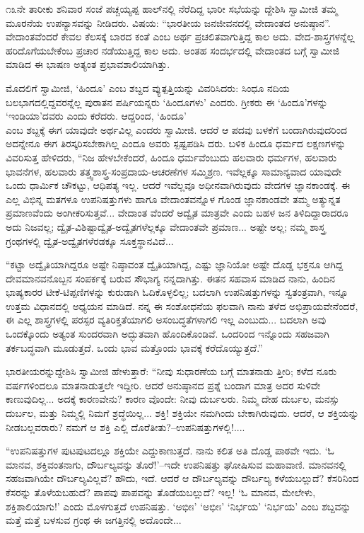 ೧೩ನೇ ತಾರೀಕು ಶನಿವಾರ ಸಂಜೆ ಪಚ್ಚಯ್ಯಪ್ಪ ಹಾಲ್​ನಲ್ಲಿ ನೆರೆದಿದ್ದ ಭಾರೀ ಸಭೆಯನ್ನು ದ್ದೇಶಿಸಿ ಸ್ವಾಮೀಜಿ ತಮ್ಮ ಮೂರನೆಯ ಉಪನ್ಯಾಸವನ್ನು ನೀಡಿದರು. ವಿಷಯ: “ಭಾರತೀಯ ಜನಜೀವನದಲ್ಲಿ ವೇದಾಂತದ ಅನುಷ್ಠಾನ”. ವೇದಾಂತವೆಂದರೆ ಕೇವಲ ಕೆಲಸಕ್ಕೆ ಬಾರದ ಕಂತೆ ಎಂಬ ಅರ್ಥ ಪ್ರಚಲಿತವಾಗುತ್ತಿದ್ದ ಕಾಲ ಅದು. ವೇದ-ಶಾಸ್ತ್ರಗಳನ್ನೆಲ್ಲ ಹರಿದೊಗೆಯಬೇಕೆಂಬ ಪ್ರಚಾರ ನಡೆಯುತ್ತಿದ್ದ ಕಾಲ ಅದು. ಅಂತಹ ಸಂದರ್ಭದಲ್ಲಿ ವೇದಾಂತದ ಬಗ್ಗೆ ಸ್ವಾಮೀಜಿ ಮಾಡಿದ ಈ ಭಾಷಣ ಅತ್ಯಂತ ಪ್ರಭಾವಶಾಲಿಯಾಗಿತ್ತು.

ಮೊದಲಿಗೆ ಸ್ವಾಮೀಜಿ, ‘ಹಿಂದೂ’ ಎಂಬ ಶಬ್ದದ ವ್ಯುತ್ಪತ್ತಿಯನ್ನು ವಿವರಿಸಿದರು: ಸಿಂಧೂ ನದಿಯ ಬಲಭಾಗದಲ್ಲಿದ್ದವರನ್ನೆಲ್ಲ ಪುರಾತನ ಪರ್ಷಿಯನ್ನರು ‘ಹಿಂದೂಗಳು’ ಎಂದರು. ಗ್ರೀಕರು ಈ ‘ಹಿಂದೂ’ಗಳನ್ನು ‘ಇಂಡಿಯಾ’ದವರು ಎಂದು ಕರೆದರು. ಆದ್ದರಿಂದ, ‘ಹಿಂದೂ’\\ಎಂಬ ಶಬ್ದಕ್ಕೆ ಈಗ ಯಾವುದೇ ಅರ್ಥವಿಲ್ಲ ಎಂದರು ಸ್ವಾಮೀಜಿ. ಆದರೆ ಆ ಪದವು ಬಳಕೆಗೆ ಬಂದಾಗಿರುವುದರಿಂದ ಅದನ್ನೇನೂ ಈಗ ತಿರಸ್ಕರಿಸಬೇಕಾಗಿಲ್ಲ ಎಂದೂ ಅವರು ಸ್ಪಷ್ಟಪಡಿಸಿ ದರು. ಬಳಿಕ ಹಿಂದೂ ಧರ್ಮದ ಲಕ್ಷಣಗಳನ್ನು ವಿವರಿಸುತ್ತ ಹೇಳಿದರು, “ನಿಜ ಹೇಳಬೇಕೆಂದರೆ, ಹಿಂದೂ ಧರ್ಮವೆಂಬುದು ಹಲವಾರು ಧರ್ಮಗಳ, ಹಲವಾರು ಭಾವನೆಗಳ, ಹಲವಾರು ತತ್ತ್ವಶಾಸ್ತ್ರ-ಸಂಪ್ರದಾಯ-ಆಚರಣೆಗಳ ಸಮ್ಮಿಶ್ರಣ. ಇವೆಲ್ಲಕ್ಕೂ ಸಾಮಾನ್ಯವಾದ ಯಾವುದೇ ಒಂದು ಧಾರ್ಮಿಕ ಚೌಕಟ್ಟು, ಆಧಿಪತ್ಯ ಇಲ್ಲ. ಆದರೆ ಇವೆಲ್ಲವೂ ಅಧೀನವಾಗಿರುವುದು ವೇದಗಳ ಜ್ಞಾನಕಾಂಡಕ್ಕೆ. ಈ ಎಲ್ಲ ವಿಭಿನ್ನ ಮತಗಳೂ ಉಪನಿಷತ್ತುಗಳು ಹಾಗೂ ವೇದಾಂತವನ್ನೊಳ ಗೊಂಡ ಜ್ಞಾನಕಾಂಡವೇ ತಮ್ಮ ಅತ್ಯುನ್ನತ ಪ್ರಮಾಣವೆಂದು ಅಂಗೀಕರಿಸುತ್ತವೆ... ವೇದಾಂತ ವೆಂದರೆ ಅದ್ವೈತ ಮಾತ್ರವೇ ಎಂದು ಬಹಳ ಜನ ತಿಳಿದಿದ್ದಾರಾದರೂ ಅದು ನಿಜವಲ್ಲ; ದ್ವೈತ-ವಿಶಿಷ್ಟಾದ್ವೈತ-ಅದ್ವೈತಗಳೆಲ್ಲಕ್ಕೂ ವೇದಾಂತವೇ ಪ್ರಮಾಣ... ಅಷ್ಟೇ ಅಲ್ಲ; ನಮ್ಮ ಶಾಸ್ತ್ರ ಗ್ರಂಥಗಳಲ್ಲಿ ದ್ವೈತ-ಅದ್ವೈತಗಳೆರಡಕ್ಕೂ ಸೂಕ್ತಸ್ಥಾನವಿದೆ... 

“ಕಟ್ಟಾ ಅದ್ವೈತಿಯಾಗಿದ್ದರೂ ಅಷ್ಟೇ ನಿಷ್ಠಾವಂತ ದ್ವೈತಿಯಾಗಿದ್ದ, ಎಷ್ಟು ಜ್ಞಾನಿಯೋ ಅಷ್ಟೇ ದೊಡ್ಡ ಭಕ್ತನೂ ಆಗಿದ್ದ ದೇವಮಾನವನೊಬ್ಬನ ಸಂಪರ್ಕಕ್ಕೆ ಬರುವ ಸೌಭಾಗ್ಯ ನನ್ನದಾಗಿತ್ತು. ಈತನ ಸಹವಾಸ ಮಾಡಿದ ನಾನು, ಹಿಂದಿನ ಭಾಷ್ಯಕಾರರ ಟೀಕೆ-ಟಿಪ್ಪಣಿಗಳನ್ನು ಕುರುಡಾಗಿ ಓದಿಕೊಳ್ಳಲಿಲ್ಲ; ಬದಲಾಗಿ ಉಪನಿಷತ್ತುಗಳನ್ನು ಸ್ವತಂತ್ರವಾಗಿ, ಇನ್ನೂ ಉತ್ತಮ ವಿಧಾನದಲ್ಲಿ ಅಧ್ಯಯನ ಮಾಡಿದೆ. ನನ್ನ ಈ ಸಂಶೋಧನೆಯ ಫಲವಾಗಿ ನಾನು ತಳೆದ ಅಭಿಪ್ರಾಯವೇನೆಂದರೆ, ಈ ಎಲ್ಲ ಶಾಸ್ತ್ರಗಳಲ್ಲಿ ಪರಸ್ಪರ ವ್ಯತಿರಿಕ್ತತೆಯಾಗಲಿ ಅಸಂಬದ್ಧತೆಗಳಾಗಲಿ ಇಲ್ಲ ಎಂಬುದು... ಬದಲಾಗಿ ಅವು ಒಂದಕ್ಕೊಂದು ಅತ್ಯಂತ ಸುಂದರವಾಗಿ ಅದ್ಭುತವಾಗಿ ಹೊಂದಿಕೊಂಡಿವೆ. ಒಂದರಿಂದ ಇನ್ನೊಂದು ಸಹಜವಾಗಿ ತರ್ಕಬದ್ಧವಾಗಿ ಮೂಡುತ್ತದೆ. ಒಂದು ಭಾವ ಮತ್ತೊಂದು ಭಾವಕ್ಕೆ ಕರೆದೊಯ್ಯುತ್ತದೆ.”

ಭಾರತೀಯರನ್ನುದ್ದೇಶಿಸಿ ಸ್ವಾಮೀಜಿ ಹೇಳುತ್ತಾರೆ: “ನೀವು ಸುಧಾರಣೆಯ ಬಗ್ಗೆ ಮಾತನಾಡು ತ್ತೀರಿ; ಕಳೆದ ನೂರು ವರ್ಷಗಳಿಂದಲೂ ಮಾತನಾಡುತ್ತಲೇ ಇದ್ದೀರಿ. ಆದರೆ ಅನುಷ್ಠಾನದ ಪ್ರಶ್ನೆ ಬಂದಾಗ ಮಾತ್ರ ಅದರ ಸುಳಿವೇ ಕಾಣುವುದಿಲ್ಲ... ಅದಕ್ಕೆ ಕಾರಣವೇನು? ಕಾರಣ ವೊಂದೇ: ನೀವು ದುರ್ಬಲರು. ನಿಮ್ಮ ದೇಹ ದುರ್ಬಲ, ಮನಸ್ಸು ದುರ್ಬಲ, ಮತ್ತು ನಿಮ್ಮಲ್ಲಿ ನಿಮಗೆ ಶ್ರದ್ಧೆಯಿಲ್ಲ... ಶಕ್ತಿ! ಶಕ್ತಿಯೇ ನಮಗಿಂದು ಬೇಕಾಗಿರುವುದು. ಆದರೆ, ಆ ಶಕ್ತಿಯನ್ನು ನೀಡಬಲ್ಲವರಾರು? ನಮಗೆ ಆ ಶಕ್ತಿ ಎಲ್ಲಿ ದೊರೆತೀತು?–ಉಪನಿಷತ್ತುಗಳಲ್ಲಿ!....

“ಉಪನಿಷತ್ತುಗಳ ಪುಟಪುಟದಲ್ಲೂ ಶಕ್ತಿಯೇ ಎದ್ದುಕಾಣುತ್ತದೆ. ನಾನು ಕಲಿತ ಅತಿ ದೊಡ್ಡ ಪಾಠವೇ ಇದು. ‘ಓ ಮಾನವ, ಶಕ್ತಿವಂತನಾಗು, ದೌರ್ಬಲ್ಯವನ್ನು ತೊರೆ!’–ಇದೇ ಉಪನಿಷತ್ತು ಘೋಷಿಸುವ ಮಹಾವಾಣಿ. ಮಾನವನಲ್ಲಿ ಸಹಜವಾಗಿಯೇ ದೌರ್ಬಲ್ಯವಿಲ್ಲವೆ? ಹೌದು, ಇದೆ. ಆದರೆ ಆ ದೌರ್ಬಲ್ಯವನ್ನು ದೌರ್ಬಲ್ಯ ಕಳೆಯಬಲ್ಲುದೆ? ಕೆಸರಿನಿಂದ ಕೆಸರನ್ನು ತೊಳೆಯಬಹುದೆ? ಪಾಪವು ಪಾಪವನ್ನು ತೊಡೆಯಬಲ್ಲುದೆ? ಇಲ್ಲ! ‘ಓ ಮಾನವ, ಮೇಲೇಳು, ಶಕ್ತಿಶಾಲಿಯಾಗು!’ ಎಂದು ಮೊಳಗುತ್ತದೆ ಉಪನಿಷತ್ತು. ‘ಅಭೀಃ’ ‘ಅಭೀಃ’ ‘ನಿರ್ಭಯ’ ‘ನಿರ್ಭಯ’ ಎಂಬ ಶಬ್ದವನ್ನು ಮತ್ತೆ ಮತ್ತೆ ಬಳಸುವ ಗ್ರಂಥ ಈ ಜಗತ್ತಿನಲ್ಲಿ ಅದೊಂದೇ...

